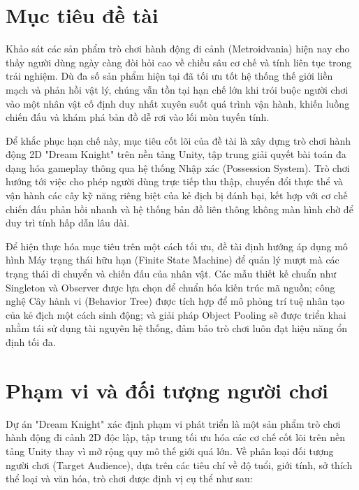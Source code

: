 \documentclass[../DoAn.tex]{subfiles}
\begin{document}
\newpage

\section{Mục tiêu đề tài}
\label{section:1.2}

Khảo sát các sản phẩm trò chơi hành động đi cảnh (Metroidvania) hiện nay cho thấy người dùng ngày càng đòi hỏi cao về chiều sâu cơ chế và tính liên tục trong trải nghiệm. Dù đa số sản phẩm hiện tại đã tối ưu tốt hệ thống thế giới liền mạch và phản hồi vật lý, chúng vẫn tồn tại hạn chế lớn khi trói buộc người chơi vào một nhân vật cố định duy nhất xuyên suốt quá trình vận hành, khiến luồng chiến đấu và khám phá bản đồ dễ rơi vào lối mòn tuyến tính. 

Để khắc phục hạn chế này, mục tiêu cốt lõi của đề tài là xây dựng trò chơi hành động 2D "Dream Knight" trên nền tảng Unity, tập trung giải quyết bài toán đa dạng hóa gameplay thông qua hệ thống Nhập xác (Possession System). Trò chơi hướng tới việc cho phép người dùng trực tiếp thu thập, chuyển đổi thực thể và vận hành các cây kỹ năng riêng biệt của kẻ địch bị đánh bại, kết hợp với cơ chế chiến đấu phản hồi nhanh và hệ thống bản đồ liên thông không màn hình chờ để duy trì tính hấp dẫn lâu dài.

Để hiện thực hóa mục tiêu trên một cách tối ưu, đề tài định hướng áp dụng mô hình Máy trạng thái hữu hạn (Finite State Machine) để quản lý mượt mà các trạng thái di chuyển và chiến đấu của nhân vật. Các mẫu thiết kế chuẩn như Singleton và Observer được lựa chọn để chuẩn hóa kiến trúc mã nguồn; công nghệ Cây hành vi (Behavior Tree) được tích hợp để mô phỏng trí tuệ nhân tạo của kẻ địch một cách sinh động; và giải pháp Object Pooling sẽ được triển khai nhằm tái sử dụng tài nguyên hệ thống, đảm bảo trò chơi luôn đạt hiệu năng ổn định tối đa.

\newpage

\section{Phạm vi và đối tượng người chơi}
\label{section:1.3}

Dự án "Dream Knight" xác định phạm vi phát triển là một sản phẩm trò chơi hành động đi cảnh 2D độc lập, tập trung tối ưu hóa các cơ chế cốt lõi trên nền tảng Unity thay vì mở rộng quy mô thế giới quá lớn. Về phân loại đối tượng người chơi (Target Audience), dựa trên các tiêu chí về độ tuổi, giới tính, sở thích thể loại và văn hóa, trò chơi được định vị cụ thể như sau:
\end{document}
